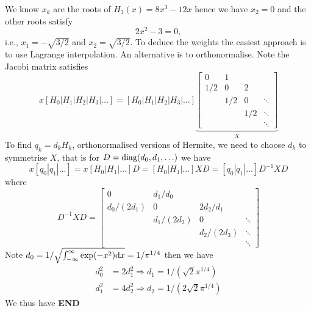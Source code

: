 \documentclass[12pt,a4paper]{article}
\begin{document}
We know $x_k$ are the roots of $H_3(x) = 8x^3 - 12x$ hence we have $x_2 = 0$ and the other roots satisfy
\[
2x^2 - 3 = 0,
\]
i.e., $x_1 = -\sqrt{3/2}$ and $x_2 = \sqrt{3/2}$. To deduce the weights the easiest approach is to use Lagrange interpolation. An alternative is to orthonormalise. Note the Jacobi matrix satisfies
\[
x [H_0 | H_1 | H_2 | H_3 | \ensuremath{\ldots}] = [H_0 | H_1 | H_2 | H_3 | \ensuremath{\ldots}] \underbrace{\begin{bmatrix} 0 & 1  \\
                                                                    1/2 & 0 & 2 \\
                                                                       & 1/2 & 0 &  \ensuremath{\ddots}\\
                                                                          && 1/2 & \ensuremath{\ddots} \\
                                                                                &&& \ensuremath{\ddots} \end{bmatrix}}_X
\]
To find $q_k = d_k H_k$, orthonormalised versions of Hermite, we need to choose $d_k$ to symmetrise $X$, that is for $D = {\rm diag}(d_0,d_1,\ensuremath{\ldots})$ we have
\[
x [q_0 | q_1 | \ensuremath{\ldots}] = x [H_0 | H_1 | \ensuremath{\ldots}] D = [H_0 | H_1 | \ensuremath{\ldots}] X D = [q_0 | q_1 | \ensuremath{\ldots}] D^{-1} X D
\]
where
\[
D^{-1} X D = \begin{bmatrix}                                                 0 & d_1/d_0  \\
                                                                    d_0/(2d_1) & 0 & 2d_2/d_1 \\
                                                                    & d_1/(2d_2) & 0 &  \ensuremath{\ddots}\\
                                                                        && d_2/(2d_3) & \ensuremath{\ddots} \\
                                                                     &&& \ensuremath{\ddots} \end{bmatrix}
\]
Note $d_0 = 1/\sqrt{\ensuremath{\int}_{-\ensuremath{\infty}}^\ensuremath{\infty} \exp(-x^2) {\rm d} x } = 1/\ensuremath{\pi}^{1/4}$ then we have
\begin{align*}
d_0^2 &= 2 d_1^2 \ensuremath{\Rightarrow} d_1 = 1/(\sqrt{2} \ensuremath{\pi}^{1/4}) \\
d_1^2 &= 4 d_2^2 \ensuremath{\Rightarrow} d_2 = 1/(2\sqrt{2} \ensuremath{\pi}^{1/4})
\end{align*}
We thus have
\textbf{END}
\end{document}
